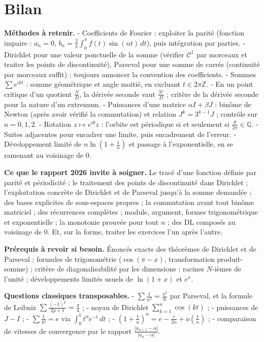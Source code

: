 \documentclass[11pt,a4paper]{article}
\begin{document}
\hypertarget{bilan}{%
\section{Bilan}\label{bilan}}

\textbf{Méthodes à retenir.}
- Coefficients de Fourier : exploiter la parité (fonction impaire : \(a_n=0\), \(b_n=\frac2\pi\int_0^\pi f(t)\sin(nt)\,dt\)), puis intégration par parties.
- Dirichlet pour une valeur ponctuelle de la somme (vérifier \({\mathcal{C}}^1\) par morceaux et traiter les points de discontinuité), Parseval pour une somme de carrés (continuité par morceaux suffit) ; toujours annoncer la convention des coefficients.
- Sommes \(\sum e^{ikt}\) : somme géométrique et angle moitié, en excluant \(t\in2\pi\mathbb{Z}\).
- En un point critique d'un quotient \(\frac ND\), la dérivée seconde vaut \(\frac{N'}D\) ; critère de la dérivée seconde pour la nature d'un extremum.
- Puissances d'une matrice \(\alpha I+\beta J\) : binôme de Newton (après avoir vérifié la commutation) et relation \(J^k=3^{k-1}J\) ; contrôle sur \(n=0,1,2\).
- Rotation \(z\mapsto e^{i\theta}z\) : l'orbite est périodique si et seulement si \(\frac\theta{2\pi}\in\mathbb{Q}\).
- Suites adjacentes pour encadrer une limite, puis encadrement de l'erreur.
- Développement limité de \(n\ln(1+\frac1n)\) et passage à l'exponentielle, en se ramenant au voisinage de \(0\).

\textbf{Ce que le rapport 2026 invite à soigner.} Le tracé d'une fonction définie par parité et périodicité ; le traitement des points de discontinuité dans Dirichlet ; l'exploitation concrète de Dirichlet et de Parseval jusqu'à la somme demandée ; des bases explicites de sous-espaces propres ; la commutation avant tout binôme matriciel ; des récurrences complètes ; module, argument, formes trigonométrique et exponentielle ; la monotonie prouvée pour tout \(n\) ; des DL composés au voisinage de \(0\). Et, sur la forme, traiter les exercices l'un après l'autre.

\textbf{Prérequis à revoir si besoin.} Énoncés exacts des théorèmes de Dirichlet et de Parseval ; formules de trigonométrie (\(\cos(\pi-x)\), transformation produit-somme) ; critère de diagonalisabilité par les dimensions ; racines \(N\)-ièmes de l'unité ; développements limités usuels de \(\ln(1+x)\) et \(e^x\).

\textbf{Questions classiques transposables.}
- \(\sum\frac1{n^2}=\frac{\pi^2}6\) par Parseval, et la formule de Leibniz \(\sum\frac{(-1)^p}{2p+1}=\frac\pi4\) ;
- noyau de Dirichlet \(\sum_{k=1}^n\cos(kt)\) ;
- puissances de \(J-I\) ;
- \(\sum\frac1{k!}=e\) via \(\int_0^1t^ne^{-t}\,dt\) ;
- \((1+\frac1n)^n=e-\frac e{2n}+o(\frac1n)\) ;
- comparaison de vitesses de convergence par le rapport \(\frac{|u_{n+1}-\alpha|}{|u_n-\alpha|}\).
\end{document}
